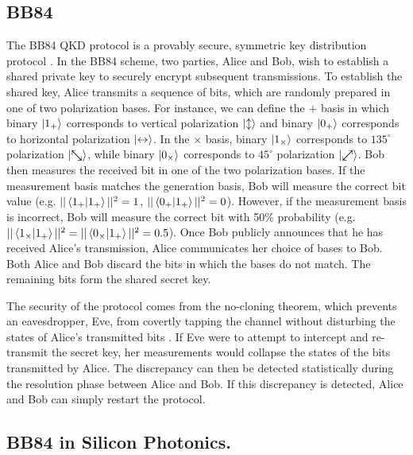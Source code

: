 \documentclass[letterpaper, 10 pt, conference]{ieeeconf}  %
\newcommand{\nwsearrow}{%
  \mathrel{\text{\ooalign{$\nwarrow$\cr$\searrow$}}}%
}
\newcommand{\neswarrow}{%
  \mathrel{\text{\ooalign{$\swarrow$\cr$\nearrow$}}}%
}
\begin{document}
\subsection{BB84} The BB84 QKD protocol is a provably secure, symmetric key distribution protocol \cite{bb84paper,bb84security}. In the BB84 scheme, two parties, Alice and Bob, wish to establish a shared private key to securely encrypt subsequent transmissions. To establish the shared key, Alice transmits a sequence of bits, which are randomly prepared in one of two polarization bases. For instance, we can define the $+$ basis in which binary $\ket{1_+}$ corresponds to vertical polarization $\ket{\updownarrow}$ and binary $\ket{0_+}$ corresponds to horizontal polarization $\ket{\leftrightarrow}$. In the $\times$ basis, binary $\ket{1_\times}$ corresponds to $135^\circ$ polarization $\ket{\nwsearrow}$, while binary $\ket{0_{\times}}$ corresponds to $45^\circ$ polarization $\ket{\neswarrow}$. Bob then measures the received bit in one of the two polarization bases. If the measurement basis matches the generation basis, Bob will measure the correct bit value (e.g. $||\braket{1_+}{1_+}||^2 =1$, $||\braket{0_+}{1_+}||^2=0$). However, if the measurement basis is incorrect, Bob will measure the correct bit with 50\% probability (e.g. $||\braket{1_\times}{1_+}||^2 = ||\braket{0_\times}{1_+}||^2= 0.5$). Once Bob publicly announces that he has received Alice's transmission, Alice communicates her choice of bases to Bob. Both Alice and Bob discard the bits in which the bases do not match. The remaining bits form the shared secret key. 

The security of the protocol comes from the no-cloning theorem, which prevents an eavesdropper, Eve, from covertly tapping the channel without disturbing the states of Alice's transmitted bits \cite{bb84security}. If Eve were to attempt to intercept and re-transmit the secret key, her measurements would collapse the states of the bits transmitted by Alice. The discrepancy can then be detected statistically during the resolution phase between Alice and Bob. If this discrepancy is detected, Alice and Bob can simply restart the protocol.

\subsection{BB84 in Silicon Photonics.}
\end{document}
